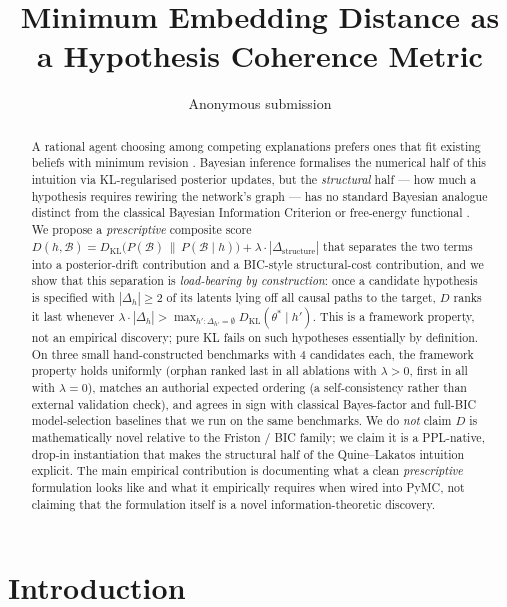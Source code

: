 \documentclass{article}
\title{\textbf{Minimum Embedding Distance as a Hypothesis Coherence Metric}}
\author{%
  Anonymous submission\\
}
\date{}
\begin{document}
\maketitle

\begin{abstract}
\noindent A rational agent choosing among competing explanations prefers
ones that fit existing beliefs with minimum revision
\citep{quine1951twodogmas, lakatos1970}. Bayesian inference formalises
the numerical half of this intuition via KL-regularised posterior
updates, but the \emph{structural} half --- how much a hypothesis
requires rewiring the network's graph --- has no standard Bayesian
analogue distinct from the classical Bayesian Information Criterion
\citep{schwarz1978} or free-energy functional \citep{friston2010free}.
We propose a \emph{prescriptive} composite score
$D(h, \mathcal{B}) = D_{\mathrm{KL}}\big(P(\mathcal{B}) \,\|\,
P(\mathcal{B} \mid h)\big) + \lambda \cdot |\Delta_{\mathrm{structure}}|$
that separates the two terms into a posterior-drift contribution and
a BIC-style structural-cost contribution, and we show that this
separation is \emph{load-bearing by construction}: once a candidate
hypothesis is specified with $|\Delta_{h}| \geq 2$ of its latents
lying off all causal paths to the target, $D$ ranks it last whenever
$\lambda \cdot |\Delta_{h}| >
\max_{h': \Delta_{h'} = \emptyset} D_{\mathrm{KL}}(\theta^{*} \mid h')$.
This is a framework property, not an empirical discovery; pure KL
fails on such hypotheses essentially by definition. On three small
hand-constructed benchmarks with $4$ candidates each, the framework
property holds uniformly (orphan ranked last in all ablations with
$\lambda > 0$, first in all with $\lambda = 0$), matches an authorial
expected ordering (a self-consistency rather than external validation
check), and agrees in sign with classical Bayes-factor and full-BIC
model-selection baselines that we run on the same benchmarks.
We do \emph{not} claim $D$ is mathematically novel relative to the
Friston / BIC family; we claim it is a PPL-native, drop-in
instantiation that makes the structural half of the
Quine--Lakatos intuition explicit. The main empirical contribution
is documenting what a clean \emph{prescriptive} formulation looks
like and what it empirically requires when wired into PyMC, not
claiming that the formulation itself is a novel information-theoretic
discovery.
\end{abstract}

\section{Introduction}
\label{sec:intro}
\end{document}
